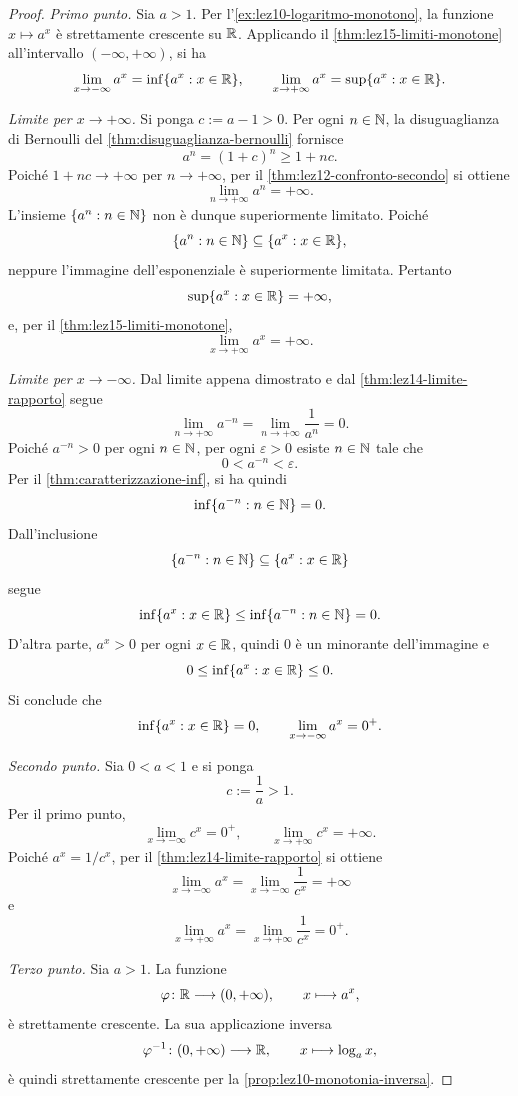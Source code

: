 \begin{proof}
\emph{Primo punto.}
Sia \(a>1\). Per l'\cref{ex:lez10-logaritmo-monotono},
la funzione \(x\longmapsto a^x\) è strettamente crescente
su \(\mathbb{R}\). Applicando il \cref{thm:lez15-limiti-monotone}
all'intervallo \((-\infty,+\infty)\), si ha
\[
  \lim_{x\to-\infty}a^x
    =\inf\{a^x:x\in\mathbb{R}\},
  \qquad
  \lim_{x\to+\infty}a^x
    =\sup\{a^x:x\in\mathbb{R}\}.
\]

\emph{Limite per \(x\to+\infty\).}
Si ponga \(c:=a-1>0\). Per ogni \(n\in\mathbb{N}\),
la disuguaglianza di Bernoulli del
\cref{thm:disuguaglianza-bernoulli} fornisce
\[
  a^n=(1+c)^n\ge1+nc.
\]
Poiché \(1+nc\to+\infty\) per \(n\to+\infty\),
per il \cref{thm:lez12-confronto-secondo} si ottiene
\[
  \lim_{n\to+\infty}a^n=+\infty.
\]
L'insieme \(\{a^n:n\in\mathbb{N}\}\) non è dunque
superiormente limitato. Poiché
\[
  \{a^n:n\in\mathbb{N}\}\subseteq\{a^x:x\in\mathbb{R}\},
\]
neppure l'immagine dell'esponenziale è superiormente
limitata. Pertanto
\[
  \sup\{a^x:x\in\mathbb{R}\}=+\infty,
\]
e, per il \cref{thm:lez15-limiti-monotone},
\[
  \lim_{x\to+\infty}a^x=+\infty.
\]

\emph{Limite per \(x\to-\infty\).}
Dal limite appena dimostrato e dal
\cref{thm:lez14-limite-rapporto} segue
\[
  \lim_{n\to+\infty}a^{-n}
    =\lim_{n\to+\infty}\frac1{a^n}=0.
\]
Poiché \(a^{-n}>0\) per ogni \(n\in\mathbb{N}\), per ogni
\(\varepsilon>0\) esiste \(n\in\mathbb{N}\) tale che
\[
  0<a^{-n}<\varepsilon.
\]
Per il \cref{thm:caratterizzazione-inf}, si ha quindi
\[
  \inf\{a^{-n}:n\in\mathbb{N}\}=0.
\]
Dall'inclusione
\[
  \{a^{-n}:n\in\mathbb{N}\}\subseteq\{a^x:x\in\mathbb{R}\}
\]
segue
\[
  \inf\{a^x:x\in\mathbb{R}\}
  \le\inf\{a^{-n}:n\in\mathbb{N}\}=0.
\]
D'altra parte, \(a^x>0\) per ogni \(x\in\mathbb{R}\), quindi
\(0\) è un minorante dell'immagine e
\[
  0\le\inf\{a^x:x\in\mathbb{R}\}\le0.
\]
Si conclude che
\[
  \inf\{a^x:x\in\mathbb{R}\}=0,
  \qquad
  \lim_{x\to-\infty}a^x=0^+.
\]

\emph{Secondo punto.}
Sia \(0<a<1\) e si ponga
\[
  c:=\frac1a>1.
\]
Per il primo punto,
\[
  \lim_{x\to-\infty}c^x=0^+,
  \qquad
  \lim_{x\to+\infty}c^x=+\infty.
\]
Poiché \(a^x=1/c^x\), per il
\cref{thm:lez14-limite-rapporto} si ottiene
\[
  \lim_{x\to-\infty}a^x
    =\lim_{x\to-\infty}\frac1{c^x}
    =+\infty
\]
e
\[
  \lim_{x\to+\infty}a^x
    =\lim_{x\to+\infty}\frac1{c^x}
    =0^+.
\]

\emph{Terzo punto.}
Sia \(a>1\). La funzione
\[
  \varphi\colon\mathbb{R}\longrightarrow(0,+\infty),
  \qquad x\longmapsto a^x,
\]
è strettamente crescente. La sua applicazione inversa
\[
  \varphi^{-1}\colon(0,+\infty)\longrightarrow\mathbb{R},
  \qquad x\longmapsto\log_a x,
\]
è quindi strettamente crescente per la
\cref{prop:lez10-monotonia-inversa}.


\end{proof}
